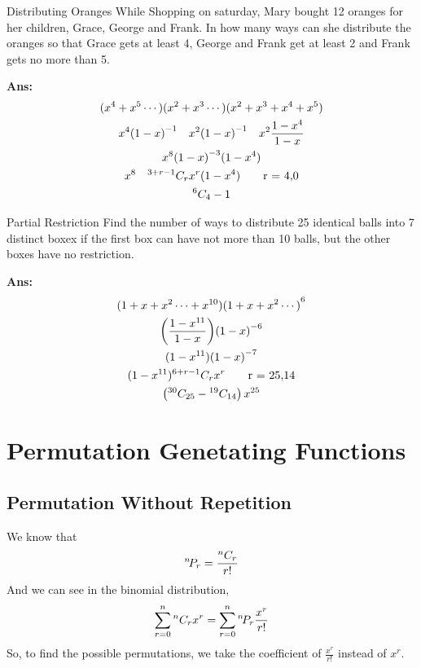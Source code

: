 \begin{exampletcb}{Distributing Oranges}{}
    While Shopping on saturday, Mary bought 12 oranges for her children, Grace, George and Frank. In how many ways can she distribute the oranges so that Grace gets at least 4, George and Frank get at least 2 and Frank gets no more than 5.

    \textbf{Ans:}
    \begin{gather*}
        {(x^4 + x^5 \cdots)}{(x^2 + x^3 \cdots )}{(x^2 + x^3 + x^4 + x^5)} \\
        x^4 {(1 - x)}^{-1} \quad x^2 {(1 - x)}^{-1} \quad x^2 \frac{1 - x^4}{1 - x}\\
        x^8 {(1 - x)}^{-3} (1 - x^4) \\
        x^8 \quad {}^{3 + r - 1}C_{r} x^r (1 - x^4) \tag*{r = 4,0}\\
        {}^{6}C_{4} - 1
    \end{gather*}
\end{exampletcb}



\begin{exampletcb}{Partial Restriction}{}
    Find the number of ways to distribute 25 identical balls into 7 distinct boxex if the first box can have not more than 10 balls, but the other boxes have no restriction.

    \textbf{Ans:}
    \begin{gather*}
        {(1 + x + x^2\cdots + x^{10})} {(1 + x + x^2\cdots )}^6\\
        {\left(\frac{1 - x^{11}}{1 - x}\right)} {(1 - x)}^{-6} \\
        {(1 - x^{11})} {(1 - x)}^{-7} \\
        {(1 - x^{11})} {}^{6 + r - 1}C_{r} x^r \tag*{r = 25,14} \\
        \left({}^{30}C_{25} - {}^{19}C_{14} \right) x^{25}
    \end{gather*}
\end{exampletcb}

\section{Permutation Genetating Functions}
\subsection{Permutation Without Repetition}

We know that
\begin{equation*}
    {}^{n}\!P_{r} = \frac{{}^{n}C_{r}}{r!}
\end{equation*}
And we can see in the binomial distribution,
\begin{equation*}
    \sum_{r = 0}^{n} {}^{n}C_{r} x^r = \sum_{r = 0}^{n} {}^{n}\!P_{r} \frac{x^r}{r!}
\end{equation*}
So, to find the possible permutations, we take the coefficient of \mbox{\(\frac{x^r}{r!}\)} instead of \mbox{\(x^r\)}.


